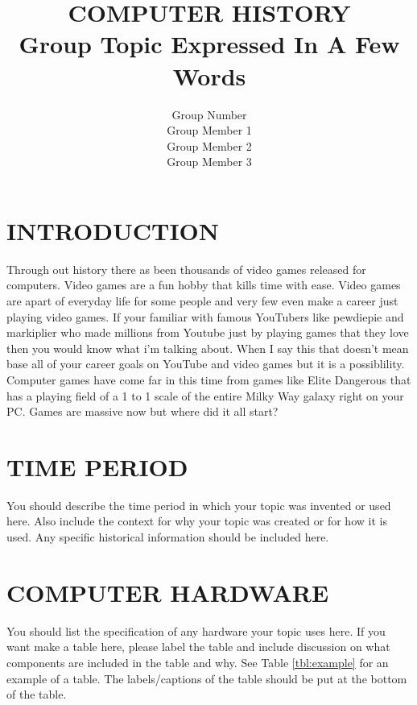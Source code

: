 \documentclass[letterpaper, 10 pt, conference]{IEEEconf}
\title{\LARGE \bf
COMPUTER HISTORY\\
\large Group Topic Expressed In A Few Words
}
\author{Group Number\\
\small Group Member 1\\
\small Group Member 2\\
\small Group Member 3\\
}
\begin{document}
\maketitle
\thispagestyle{empty}
\pagestyle{empty}



\section{INTRODUCTION}
	Through out history there as been thousands of video games released for computers. Video games are a fun hobby that kills time with ease. Video games are apart of everyday life for some people and very few even make a career just playing video games. If your familiar with famous YouTubers like pewdiepie and markiplier who made millions from Youtube just by playing games that they love then you would know what i'm talking about. When I say this that doesn't mean base all of your career goals on YouTube and video games but it is a possiblility. Computer games have come far in this time from games like Elite Dangerous that has a playing field of a 1 to 1 scale of the entire Milky Way galaxy right on your PC. Games are massive now but where did it all start? 
\section{TIME PERIOD}

You should describe the time period in which your topic was
invented or used here. Also include the context for why your
topic was created or for how it is used. Any specific historical
information should be included here.

\section{COMPUTER HARDWARE}

You should list the specification of any hardware your topic
uses here. If you want make a table here, please label the table
and include discussion on what components are included in the
table and why. See Table
\ref{tbl:example} for an example of a table.
The labels/captions of the table should be put at the bottom
of the table.
\end{document}
